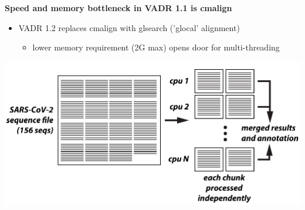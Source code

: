 \documentclass[landscape]{slides}
\begin{document}
\begin{slide}
\begin{center}
\large{\textbf{Speed and memory bottleneck in VADR 1.1 is cmalign}}
\end{center}

\begin{itemize}
\item VADR 1.2 replaces cmalign with glsearch ('glocal' alignment)
  \begin{itemize}
  \item lower memory requirement (2G max) opens door for multi-threading
  \end{itemize}
\end{itemize}

\begin{center}
\includegraphics[width=10.5in]{figs/vadr-1p2-multithreading}
\end{center}
  
\vfill
\end{slide}
\end{document}
